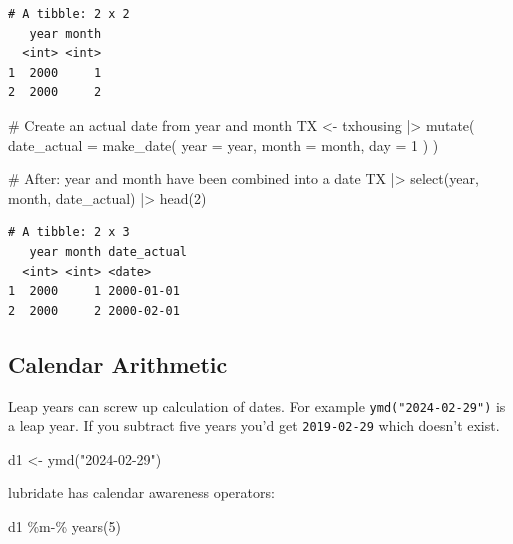 \documentclass[
  letterpaper,
  DIV=11,
  numbers=noendperiod]{scrreprt}
\newenvironment{Shaded}{\begin{snugshade}}{\end{snugshade}}
\newcommand{\AttributeTok}[1]{\textcolor[rgb]{0.40,0.45,0.13}{#1}}
\newcommand{\CommentTok}[1]{\textcolor[rgb]{0.37,0.37,0.37}{#1}}
\newcommand{\DecValTok}[1]{\textcolor[rgb]{0.68,0.00,0.00}{#1}}
\newcommand{\FunctionTok}[1]{\textcolor[rgb]{0.28,0.35,0.67}{#1}}
\newcommand{\NormalTok}[1]{\textcolor[rgb]{0.00,0.23,0.31}{#1}}
\newcommand{\OtherTok}[1]{\textcolor[rgb]{0.00,0.23,0.31}{#1}}
\newcommand{\SpecialCharTok}[1]{\textcolor[rgb]{0.37,0.37,0.37}{#1}}
\newcommand{\StringTok}[1]{\textcolor[rgb]{0.13,0.47,0.30}{#1}}
\begin{document}
\begin{verbatim}
# A tibble: 2 x 2
   year month
  <int> <int>
1  2000     1
2  2000     2
\end{verbatim}

\begin{Shaded}
\begin{Highlighting}[]
\CommentTok{\# Create an actual date from year and month}
\NormalTok{TX }\OtherTok{\textless{}{-}}\NormalTok{ txhousing }\SpecialCharTok{|\textgreater{}}
    \FunctionTok{mutate}\NormalTok{(}
        \AttributeTok{date\_actual =} \FunctionTok{make\_date}\NormalTok{(}
            \AttributeTok{year =}\NormalTok{ year,}
            \AttributeTok{month =}\NormalTok{ month,}
            \AttributeTok{day =} \DecValTok{1}
\NormalTok{        )}
\NormalTok{    )}

\CommentTok{\# After: year and month have been combined into a date}
\NormalTok{TX }\SpecialCharTok{|\textgreater{}}
    \FunctionTok{select}\NormalTok{(year, month, date\_actual) }\SpecialCharTok{|\textgreater{}}
    \FunctionTok{head}\NormalTok{(}\DecValTok{2}\NormalTok{)}
\end{Highlighting}
\end{Shaded}

\begin{verbatim}
# A tibble: 2 x 3
   year month date_actual
  <int> <int> <date>     
1  2000     1 2000-01-01 
2  2000     2 2000-02-01 
\end{verbatim}

\subsection{Calendar Arithmetic}\label{calendar-arithmetic}

Leap years can screw up calculation of dates. For example
\texttt{ymd("2024-02-29")} is a leap year. If you subtract five years
you'd get \texttt{2019-02-29} which doesn't exist.

\begin{Shaded}
\begin{Highlighting}[]
\NormalTok{d1 }\OtherTok{\textless{}{-}} \FunctionTok{ymd}\NormalTok{(}\StringTok{"2024{-}02{-}29"}\NormalTok{)}
\end{Highlighting}
\end{Shaded}

lubridate has calendar awareness operators:

\begin{Shaded}
\begin{Highlighting}[]
\NormalTok{d1 }\SpecialCharTok{\%m{-}\%} \FunctionTok{years}\NormalTok{(}\DecValTok{5}\NormalTok{)}
\end{Highlighting}
\end{Shaded}
\end{document}

